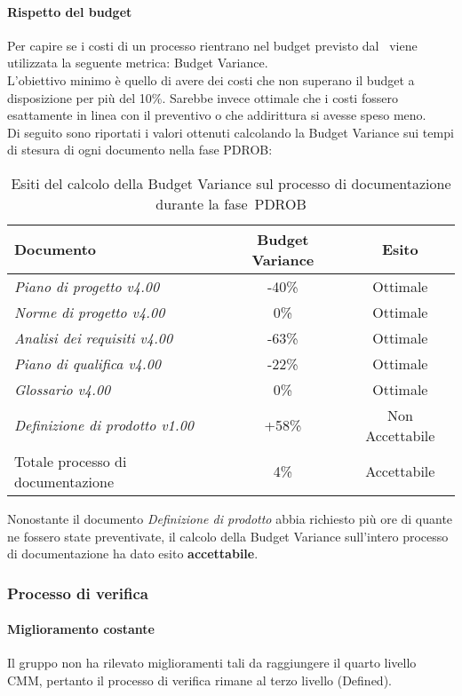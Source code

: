 \documentclass[../PianoDiQualifica.tex]{subfiles}
\begin{document}
\begin{appendices}
			\paragraph{Rispetto del budget}
			Per capire se i costi di un processo rientrano nel budget previsto dal \pianodiprogetto\ viene utilizzata la seguente metrica: Budget Variance.\\
			L'obiettivo minimo è quello di avere dei costi che non superano il budget a disposizione per più del 10\%. Sarebbe invece ottimale che i costi fossero esattamente in linea con il preventivo o che addirittura si avesse speso meno.\\
			Di seguito sono riportati i valori ottenuti calcolando la Budget Variance sui tempi di stesura di ogni documento nella fase PDROB:
			\begin{table}[H]
				\centering
				\begin{tabular}{l * {2}{c}}
					\toprule
					\textbf{Documento} & \textbf{Budget Variance} & \textbf{Esito} \\
					\midrule
					\textit{Piano di progetto v4.00} & -40\% &  Ottimale \\
					\textit{Norme di progetto v4.00} & 0\% & Ottimale \\
					\textit{Analisi dei requisiti v4.00} & -63\% & Ottimale \\
					\textit{Piano di qualifica v4.00} & -22\% & Ottimale \\
					\textit{Glossario v4.00} & 0\% & Ottimale \\
					\textit{Definizione di prodotto v1.00} & +58\% & Non Accettabile \\
					Totale processo di documentazione & 4\% & Accettabile \\
					\bottomrule
				\end{tabular}
				\caption{Esiti del calcolo della Budget Variance sul processo di documentazione durante la fase\g\ PDROB}
				\label{tab:esiti_budget_variance}
			\end{table}
			Nonostante il documento \textit{Definizione di prodotto} abbia richiesto più ore di quante ne fossero state preventivate, il calcolo della Budget Variance sull'intero processo di documentazione ha dato esito \textbf{accettabile}.
						
		\subsubsection{Processo di verifica}
			\paragraph{Miglioramento costante}
			Il gruppo non ha rilevato miglioramenti tali da raggiungere il quarto livello CMM, pertanto il processo di verifica rimane al terzo livello (Defined).
			

\end{appendices}
\end{document}
